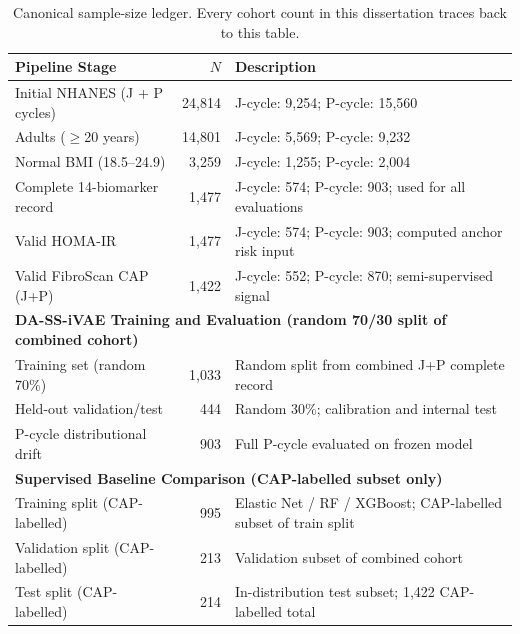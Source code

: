 \documentclass[12pt,a4paper,oneside]{report}
\begin{document}
\begin{table}[H]
\centering
\caption{Canonical sample-size ledger. Every cohort count in this dissertation traces back to this table.}
\label{tab:dataset}
\begin{tabular}{@{}p{6.5cm} r p{5.5cm}@{}}
\toprule
\textbf{Pipeline Stage} & \textbf{$N$} & \textbf{Description} \\ \midrule
Initial NHANES (J + P cycles) & 24{,}814 & J-cycle: 9,254; P-cycle: 15,560 \\
Adults ($\geq$20 years)        & 14{,}801 & J-cycle: 5,569; P-cycle: 9,232 \\
Normal BMI (18.5--24.9)        &  3{,}259 & J-cycle: 1,255; P-cycle: 2,004 \\
Complete 14-biomarker record   &  1{,}477 & J-cycle: 574; P-cycle: 903; used for all evaluations \\
Valid HOMA-IR                  &  1{,}477 & J-cycle: 574; P-cycle: 903; computed anchor risk input \\
Valid FibroScan CAP (J+P)      &  1{,}422 & J-cycle: 552; P-cycle: 870; semi-supervised signal \\
\midrule
\multicolumn{3}{l}{\textbf{DA-SS-iVAE Training and Evaluation (random 70/30 split of combined cohort)}} \\
\midrule
Training set (random 70\%)     &  1{,}033 & Random split from combined J+P complete record \\
Held-out validation/test       &    444   & Random 30\%; calibration and internal test \\
P-cycle distributional drift   &    903   & Full P-cycle evaluated on frozen model \\
\midrule
\multicolumn{3}{l}{\textbf{Supervised Baseline Comparison (CAP-labelled subset only)}} \\
\midrule
Training split (CAP-labelled)     &      995   & Elastic Net / RF / XGBoost; CAP-labelled subset of train split \\
Validation split (CAP-labelled)   &      213   & Validation subset of combined cohort \\
Test split (CAP-labelled)         &      214   & In-distribution test subset; 1{,}422 CAP-labelled total \\ \bottomrule
\end{tabular}
\end{table}
\end{document}
